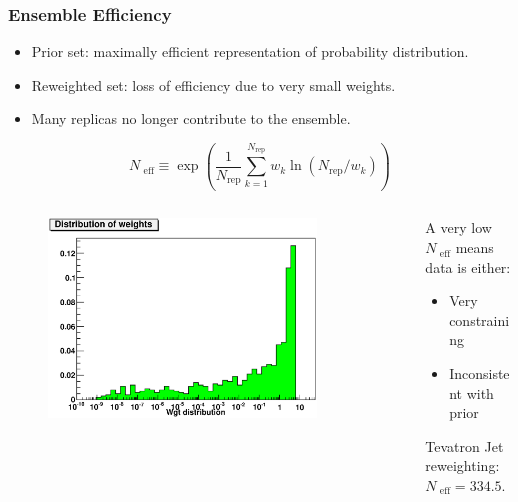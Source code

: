 \documentclass[10pt]{beamer}
\newcommand{\be}{\begin{equation*}}
\newcommand{\ee}{\end{equation*}}
\begin{document}
\begin{frame}
\frametitle{Ensemble Efficiency}

   \begin{itemize}
		\item<1-> Prior set: maximally efficient representation of probability distribution.
		\item<1-> Reweighted set: loss of efficiency due to very small weights.
		\item<1-> Many replicas no longer contribute to the ensemble.
\end{itemize}

  \be N_{\textrm{ eff}} \equiv \exp \left(\frac{1}{N_{\mathrm{rep}}}\sum_{k=1}^{N_{\mathrm{rep}}}w_k\ln(N_{\mathrm{rep}}/w_k)\right)\ee
\begin{columns}
  \begin{column}{0.45\textwidth}
 \begin{figure}[b!]
    \begin{center}
      \includegraphics[width=0.85\textwidth]{wgt-dist-jets-t0.eps}
    \end{center}
\end{figure}

  \end{column}

  \begin{column}{0.55\textwidth}
  A very low $N_{\textrm{ eff}}$ means data is either:
 \begin{itemize}
		\item<1-> Very constraining
		\item<1-> Inconsistent with prior
\end{itemize}
\vskip10pt
Tevatron Jet reweighting: $N_{\textrm{ eff}}=334.5$.
     \end{column}
\end{columns}
\end{frame}
\end{document}
